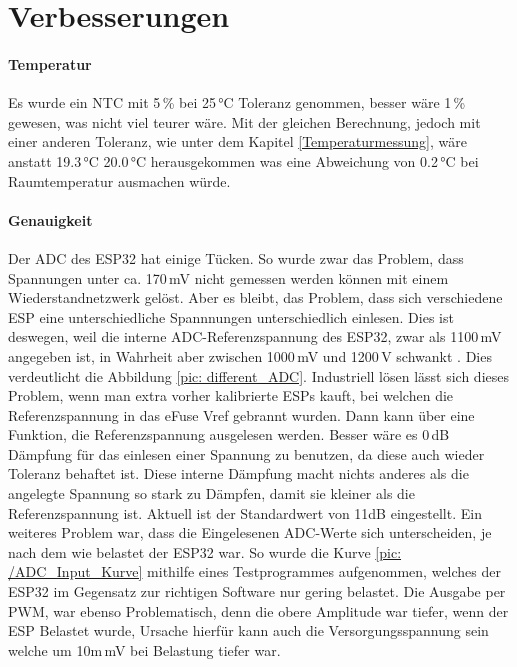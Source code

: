 \section{Verbesserungen} 
\label{Verbesserungen}

\paragraph{Temperatur}
Es wurde ein NTC mit 5\,\% bei 25\,°C Toleranz genommen, besser wäre 1\,\% gewesen, was nicht viel teurer wäre. Mit der gleichen Berechnung, jedoch mit einer anderen Toleranz, wie unter dem Kapitel \ref{Temperaturmessung}, wäre anstatt 19.3\,°C 20.0\,°C herausgekommen was eine Abweichung von 0.2\,°C bei Raumtemperatur ausmachen würde.

\paragraph{Genauigkeit}
Der ADC des ESP32 hat einige Tücken. So wurde zwar das Problem, dass Spannungen unter ca. 170\,mV nicht gemessen werden können mit einem Wiederstandnetzwerk gelöst. Aber es bleibt, das Problem, dass sich verschiedene ESP eine unterschiedliche Spannnungen unterschiedlich einlesen. Dies ist deswegen, weil die interne ADC-Referenzspannung des ESP32, zwar als 1100\,mV angegeben ist, in Wahrheit aber zwischen 1000\,mV und 1200\,V schwankt \cite{noauthor_analog_nodate}. Dies verdeutlicht die Abbildung \ref{pic: different_ADC}. Industriell lösen lässt sich dieses Problem, wenn man extra vorher kalibrierte ESPs kauft, bei welchen die Referenzspannung in das eFuse Vref gebrannt wurden. Dann kann über eine Funktion, die Referenzspannung ausgelesen werden. Besser wäre es 0\,dB Dämpfung für das einlesen einer Spannung zu benutzen, da diese auch wieder Toleranz behaftet ist. Diese interne Dämpfung macht nichts anderes als die angelegte  Spannung so stark zu Dämpfen, damit sie kleiner als die Referenzspannung ist. Aktuell ist der Standardwert von 11dB eingestellt. Ein weiteres Problem war, dass die Eingelesenen ADC-Werte sich unterscheiden, je nach dem wie belastet der ESP32 war. So wurde die Kurve \ref{pic: /ADC_Input_Kurve} mithilfe eines Testprogrammes aufgenommen, welches der ESP32 im Gegensatz zur richtigen Software nur gering belastet. Die Ausgabe per PWM, war ebenso Problematisch, denn die obere Amplitude war tiefer, wenn der ESP Belastet wurde, Ursache hierfür kann auch die Versorgungsspannung sein welche um 10m\,mV bei Belastung tiefer war.


